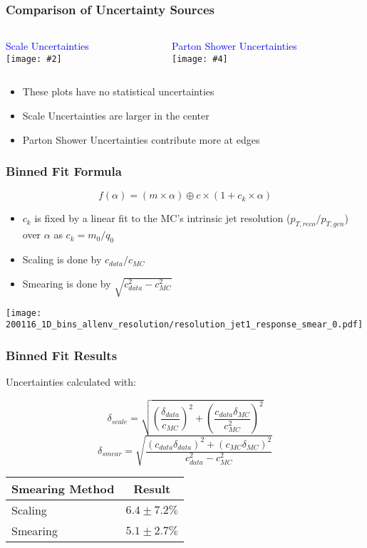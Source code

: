 \documentclass{beamer}
\newcommand{\twofigs}[4]{
  \begin{columns}
    \begin{column}{0.5\linewidth}
      \centering
      \textcolor{blue}{#1} \\
      \texttt{[image: \#2]}
    \end{column}
    \begin{column}{0.5\linewidth}
      \centering
      \textcolor{blue}{#3} \\
      \texttt{[image: \#4]}
    \end{column}
  \end{columns}
}
\begin{document}
\begin{frame}
  \frametitle{Comparison of Uncertainty Sources}

  \vspace{8pt}

  \twofigs{Scale Uncertainties}
          {200116_1D_bins_scaleenv/smearplot_2_jet1_response.pdf}
          {Parton Shower Uncertainties}
          {200116_1D_bins_psenv/smearplot_2_jet1_response.pdf}

  \begin{itemize}
  \item These plots have no statistical uncertainties
  \item Scale Uncertainties are larger in the center
  \item Parton Shower Uncertainties contribute more at edges
  \end{itemize}

\end{frame}


\begin{frame}
  \frametitle{Binned Fit Formula}

  \[
  f(\alpha) = (m \times \alpha) \oplus c \times (1 + c_k \times \alpha)
  \]

  \begin{itemize}
  \item $c_k$ is fixed by a linear fit to the MC's intrinsic jet resolution ($p_{T, reco}/p_{T, gen}$) over $\alpha$ as $c_k = m_0/q_0$
  \item Scaling is done by $c_{data}/c_{MC}$
  \item Smearing is done by $\sqrt{c_{data}^2 - c_{MC}^2}$
  \end{itemize}

  \centering
  \texttt{[image: 200116\_1D\_bins\_allenv\_resolution/resolution\_jet1\_response\_smear\_0.pdf]}

\end{frame}


\begin{frame}
  \frametitle{Binned Fit Results}

  Uncertainties calculated with:

  \[
  \delta_{scale} = \sqrt{\left(\frac{\delta_{data}}{c_{MC}}\right)^2 +
    \left(\frac{c_{data}\delta_{MC}}{c_{MC}^2}\right)^2}
  \]
  \[
  \delta_{smear} = \sqrt{\frac{(c_{data}\delta_{data})^2 +
      (c_{MC}\delta_{MC})^2}{c_{data}^2 - c_{MC}^2}}
  \]

  \vfill
  \centering
  \begin{tabular}{|l|c|}
    \hline
    Smearing Method & Result \\
    \hline
    Scaling & $6.4 \pm 7.2 \%$ \\
    Smearing & $5.1 \pm 2.7 \%$ \\
    \hline
  \end{tabular}

\end{frame}
\end{document}
